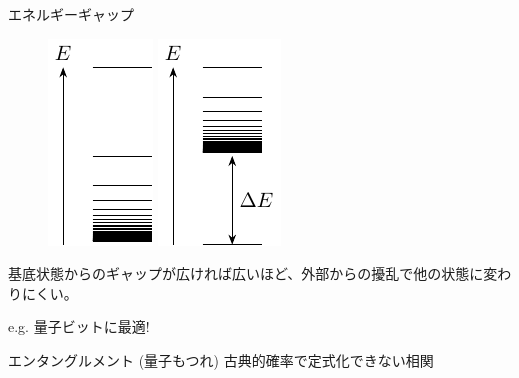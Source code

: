 \documentclass[dvipdfm]{beamer}
\begin{document}
\begin{frame}{エネルギーギャップ}
    \begin{figure}
        \centering
        \begin{minipage}{0.45\linewidth}
            \includegraphics[width=0.3\linewidth]{gapless.pdf}
        \end{minipage}
        \begin{minipage}{0.45\linewidth}
            \includegraphics[width=0.3\linewidth]{gapped.pdf}
        \end{minipage}
    \end{figure}
    基底状態からのギャップが広ければ広いほど、外部からの擾乱で他の状態に変わりにくい。

    e.g. 量子ビットに最適!
\end{frame}

\begin{frame}{エンタングルメント (量子もつれ)}
    古典的確率で定式化できない相関
\end{frame}
\end{document}
